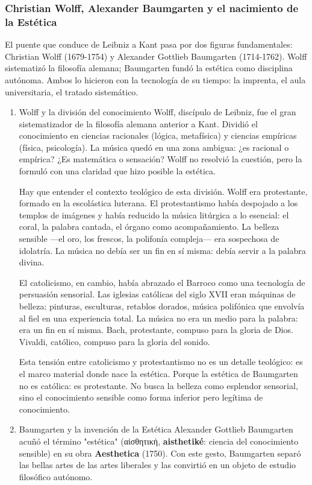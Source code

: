 \documentclass[14pt, a4paper]{article}
\begin{document}
\subsubsection{Christian Wolff, Alexander Baumgarten y el nacimiento de la Estética}
\label{wolff-baumgarten-estetica}
El puente que conduce de Leibniz a Kant pasa por dos figuras
fundamentales: Christian Wolff (1679-1754) y Alexander Gottlieb
Baumgarten (1714-1762). Wolff sistematizó la filosofía alemana;
Baumgarten fundó la estética como disciplina autónoma. Ambos lo
hicieron con la tecnología de su tiempo: la imprenta, el aula
universitaria, el tratado sistemático.
\begin{enumerate}
\item Wolff y la división del conocimiento
\label{wolff}
Wolff, discípulo de Leibniz, fue el gran sistematizador de la
filosofía alemana anterior a Kant. Dividió el conocimiento en ciencias
racionales (lógica, metafísica) y ciencias empíricas (física,
psicología). La música quedó en una zona ambigua: ¿es racional o
empírica? ¿Es matemática o sensación? Wolff no resolvió la cuestión,
pero la formuló con una claridad que hizo posible la estética.

Hay que entender el contexto teológico de esta división. Wolff era
protestante, formado en la escolástica luterana. El protestantismo
había despojado a los templos de imágenes y había reducido la música
litúrgica a lo esencial: el coral, la palabra cantada, el órgano como
acompañamiento. La belleza sensible —el oro, los frescos, la
polifonía compleja— era sospechosa de idolatría. La música no debía
ser un fin en sí misma: debía servir a la palabra divina.

El catolicismo, en cambio, había abrazado el Barroco como una
tecnología de persuasión sensorial. Las iglesias católicas del siglo
XVII eran máquinas de belleza: pinturas, esculturas, retablos dorados,
música polifónica que envolvía al fiel en una experiencia total. La
música no era un medio para la palabra: era un fin en sí misma. Bach,
protestante, compuso para la gloria de Dios. Vivaldi, católico,
compuso para la gloria del sonido.

Esta tensión entre catolicismo y protestantismo no es un detalle
teológico: es el marco material donde nace la estética. Porque la
estética de Baumgarten no es católica: es protestante. No busca la
belleza como esplendor sensorial, sino el conocimiento sensible como
forma inferior pero legítima de conocimiento.
\item Baumgarten y la invención de la Estética
\label{baumgarten}
Alexander Gottlieb Baumgarten acuñó el término "estética" (αἰσθητική,
\textbf{aisthetiké}: ciencia del conocimiento sensible) en su obra
\textbf{Aesthetica} (1750). Con este gesto, Baumgarten separó las bellas
artes de las artes liberales y las convirtió en un objeto de estudio
filosófico autónomo.


\end{enumerate}
\end{document}
